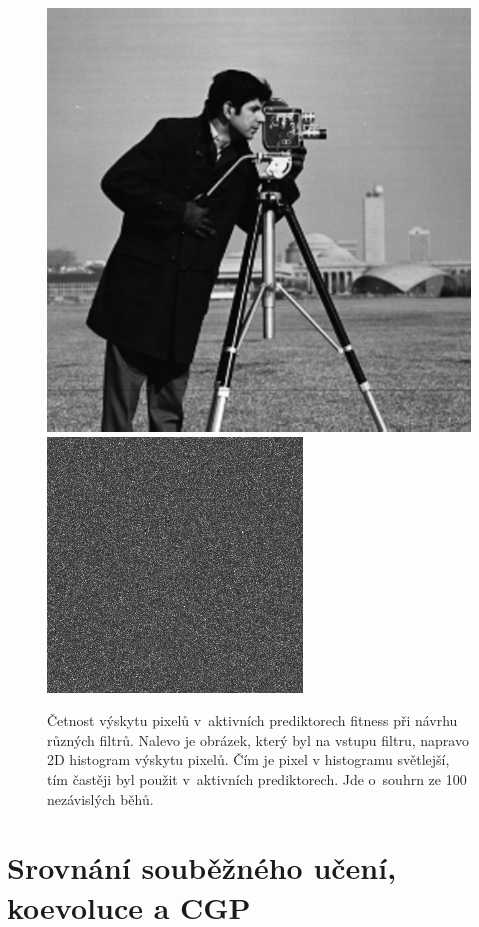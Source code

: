 \begin{figure}[hbt]
{        \includegraphics[width=\size]{fig/testimages/cameraman.png}
        \gap
        \includegraphics[width=\size]{fig/predhist/sobel.png}
        \margin
    }

    \caption{Četnost výskytu pixelů v~aktivních prediktorech fitness při návrhu různých filtrů. Nalevo je obrázek, který byl na vstupu filtru, napravo 2D histogram výskytu pixelů. Čím je pixel v histogramu světlejší, tím častěji byl použit v~aktivních prediktorech. Jde o~souhrn ze 100 nezávislých běhů.}
    \label{obrPredhist}
\end{figure}

\section{Srovnání souběžného učení, koevoluce a CGP}
\label{secExpComparison}

